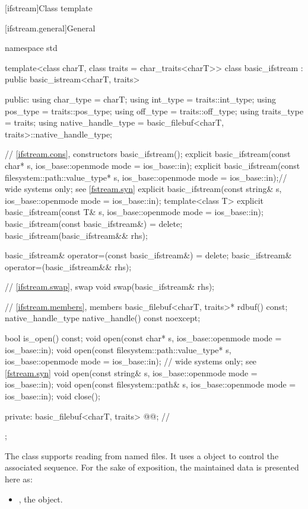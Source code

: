 [ifstream]{Class template }

[ifstream.general]{General}

%
\begin{codeblock}
namespace std {
  template<class charT, class traits = char_traits<charT>>
  class basic_ifstream : public basic_istream<charT, traits> {
  public:
    using char_type   = charT;
    using int_type    = traits::int_type;
    using pos_type    = traits::pos_type;
    using off_type    = traits::off_type;
    using traits_type = traits;
    using native_handle_type = basic_filebuf<charT, traits>::native_handle_type;

    // \ref{ifstream.cons}, constructors
    basic_ifstream();
    explicit basic_ifstream(const char* s,
                            ios_base::openmode mode = ios_base::in);
    explicit basic_ifstream(const filesystem::path::value_type* s,
                            ios_base::openmode mode = ios_base::in);// wide systems only; see \ref{fstream.syn}
    explicit basic_ifstream(const string& s,
                            ios_base::openmode mode = ios_base::in);
    template<class T>
      explicit basic_ifstream(const T& s, ios_base::openmode mode = ios_base::in);
    basic_ifstream(const basic_ifstream&) = delete;
    basic_ifstream(basic_ifstream&& rhs);

    basic_ifstream& operator=(const basic_ifstream&) = delete;
    basic_ifstream& operator=(basic_ifstream&& rhs);

    // \ref{ifstream.swap}, swap
    void swap(basic_ifstream& rhs);

    // \ref{ifstream.members}, members
    basic_filebuf<charT, traits>* rdbuf() const;
    native_handle_type native_handle() const noexcept;

    bool is_open() const;
    void open(const char* s, ios_base::openmode mode = ios_base::in);
    void open(const filesystem::path::value_type* s,
              ios_base::openmode mode = ios_base::in);  // wide systems only; see \ref{fstream.syn}
    void open(const string& s, ios_base::openmode mode = ios_base::in);
    void open(const filesystem::path& s, ios_base::openmode mode = ios_base::in);
    void close();

  private:
    basic_filebuf<charT, traits> @@;    // \expos
  };
}
\end{codeblock}

\pnum
The class
supports reading from named files.
It uses a
object to control the associated
sequence.
For the sake of exposition, the maintained data is presented here as:
\begin{itemize}
\item
{}, the  object.
\end{itemize}


